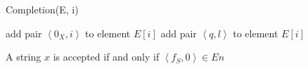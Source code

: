 \begin{algorithm}[H]
    \caption{Completion(E, i)}
        \begin{algorithmic}[1]
                    \State add pair $\left\langle 0_X,i \right\rangle$ to element $E[i]$
                \EndFor
                        \State add pair $\left\langle q,l \right\rangle$ to element $E[i]$
                    \EndFor
                \EndFor
            \EndWhile 
        \end{algorithmic}
\end{algorithm}
A string $x$ is accepted if and only if $\left\langle f_S,0 \right\rangle \in E{n}$






